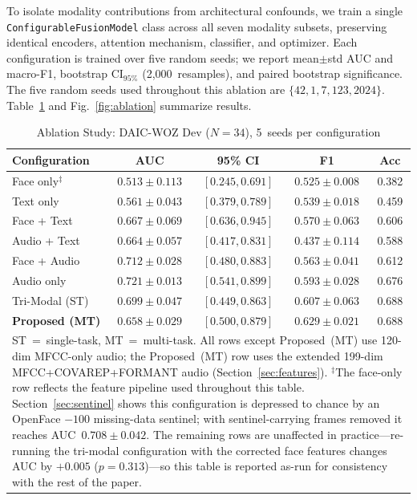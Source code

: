 \documentclass[journal]{IEEEtran}
\begin{document}
To isolate modality contributions from architectural confounds, we
train a single \texttt{ConfigurableFusionModel} class across all seven
modality subsets, preserving identical encoders, attention mechanism,
classifier, and optimizer. Each configuration is trained over five
random seeds; we report mean$\pm$std AUC and macro-F1, bootstrap
$\text{CI}_{95\%}$ (2,000~resamples), and paired bootstrap significance.
The five random seeds used throughout this ablation are
$\{42, 1, 7, 123, 2024\}$. Table~\ref{tab:ablation} and
Fig.~\ref{fig:ablation} summarize results.

\begin{table}[t]
\centering
\renewcommand{\arraystretch}{1.15}
\caption{Ablation Study: DAIC-WOZ Dev ($N{=}34$), 5~seeds per configuration}
\label{tab:ablation}
\scriptsize
\setlength{\tabcolsep}{2.5pt}
\begin{tabular}{lcccc}
\toprule
\textbf{Configuration} & \textbf{AUC} & \textbf{95\% CI} & \textbf{F1} & \textbf{Acc} \\
\midrule
Face only$^{\ddagger}$ & $0.513\pm0.113$ & $[0.245,0.691]$ & $0.525\pm0.008$ & 0.382 \\
Text only         & $0.561\pm0.043$ & $[0.379,0.789]$ & $0.539\pm0.018$ & 0.459 \\
Face + Text       & $0.667\pm0.069$ & $[0.636,0.945]$ & $0.570\pm0.063$ & 0.606 \\
Audio + Text      & $0.664\pm0.057$ & $[0.417,0.831]$ & $0.437\pm0.114$ & 0.588 \\
Face + Audio      & $0.712\pm0.028$ & $[0.480,0.883]$ & $0.563\pm0.041$ & 0.612 \\
Audio only        & $\mathbf{0.721\pm0.013}$ & $[0.541,0.899]$ & $0.593\pm0.028$ & 0.676 \\
Tri-Modal (ST)    & $0.699\pm0.047$ & $[0.449,0.863]$ & $0.607\pm0.063$ & 0.688 \\
\midrule
\textbf{Proposed (MT)} & $0.658\pm0.029$ & $[0.500,0.879]$
  & $\mathbf{0.629\pm0.021}$ & $\mathbf{0.688}$ \\
\bottomrule
\multicolumn{5}{p{0.95\columnwidth}}{\scriptsize ST~=~single-task,
MT~=~multi-task. All rows except Proposed~(MT) use 120-dim
MFCC-only audio; the Proposed~(MT) row uses the extended 199-dim
MFCC+COVAREP+FORMANT audio (Section~\ref{sec:features}).
$^{\ddagger}$The
face-only row reflects the feature pipeline used throughout this table.
Section~\ref{sec:sentinel} shows this configuration is depressed to chance
by an OpenFace $-100$ missing-data sentinel; with sentinel-carrying frames
removed it reaches AUC~$0.708\pm0.042$. The remaining rows are unaffected
in practice---re-running the tri-modal configuration with the corrected
face features changes AUC by $+0.005$ ($p{=}0.313$)---so this table is
reported as-run for consistency with the rest of the paper.} \\
\end{tabular}
\end{table}
\end{document}
